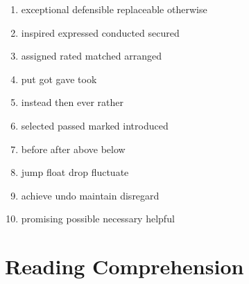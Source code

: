 \begin{enumerate}
\item

\fourchoices
{exceptional}
{defensible}
{replaceable}
{otherwise}


\item


\fourchoices
{inspired}
{expressed}
{conducted}
{secured}




\item


\fourchoices
{assigned}
{rated}
{matched}
{arranged}




\item


\fourchoices
{put}
{got}
{gave}
{took}





\item


\fourchoices
{instead}
{then}
{ever}
{rather}




\item


\fourchoices
{selected}
{passed}
{marked}
{introduced}




\item


\fourchoices
{before}
{after}
{above}
{below}







\item


\fourchoices
{jump}
{float}
{drop}
{fluctuate}



\item


\fourchoices
{achieve}
{undo}
{maintain}
{disregard}




\item


\fourchoices
{promising}
{possible}
{necessary}
{helpful}

\end{enumerate}


\vfil

\section{Reading Comprehension}


